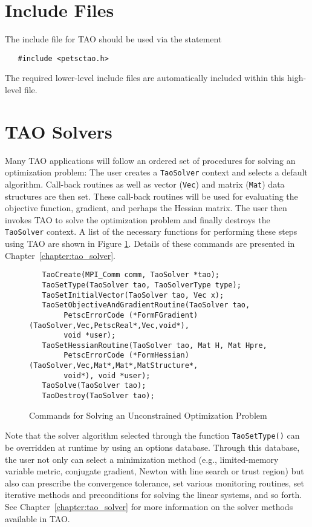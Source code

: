 \section{Include Files}

The include file for TAO should be used via the statement
\begin{verbatim}
   #include <petsctao.h>
\end{verbatim}
\noindent
The required lower-level include files are automatically included
within this high-level file.

\section{TAO Solvers}

Many TAO applications will follow an ordered set of procedures for 
solving an optimization problem:
The user creates a \texttt{TaoSolver} context and selects a default algorithm. 
Call-back routines as well as vector (\texttt{Vec}) and matrix (\texttt{Mat}) 
data structures are then set.  These call-back routines will be used for 
evaluating the objective function, gradient, and perhaps the Hessian 
matrix.  The user then invokes TAO to solve the optimization problem and 
finally destroys
the \texttt{TaoSolver} context. A list of the necessary functions for 
performing these steps
using TAO are shown in Figure \ref{fig:tao_commands}.  Details of these commands are presented in
Chapter~\ref{chapter:tao_solver}.

 
 
 
\begin{figure}[H]
\begin{verbatim}
   TaoCreate(MPI_Comm comm, TaoSolver *tao); 
   TaoSetType(TaoSolver tao, TaoSolverType type);
   TaoSetInitialVector(TaoSolver tao, Vec x);
   TaoSetObjectiveAndGradientRoutine(TaoSolver tao, 
        PetscErrorCode (*FormFGradient)(TaoSolver,Vec,PetscReal*,Vec,void*), 
        void *user);
   TaoSetHessianRoutine(TaoSolver tao, Mat H, Mat Hpre,
        PetscErrorCode (*FormHessian)(TaoSolver,Vec,Mat*,Mat*,MatStructure*,
        void*), void *user);
   TaoSolve(TaoSolver tao);
   TaoDestroy(TaoSolver tao);
\end{verbatim}
\caption{Commands for Solving an Unconstrained Optimization Problem
\label{fig:tao_commands}}
\end{figure}

Note that the solver algorithm selected through the function 
\texttt{TaoSetType()} can be overridden
at runtime by using an options database.  Through this
database, the user not only can select a minimization method (e.g.,
limited-memory variable metric, conjugate gradient, Newton with line
search or trust region) but also can prescribe the convergence
tolerance, set various monitoring routines, set iterative methods
and preconditions for solving the linear systems, and so forth.  See 
Chapter~\ref{chapter:tao_solver} for more information on the 
solver methods available in TAO.

